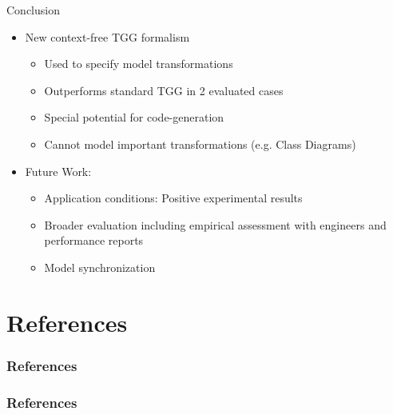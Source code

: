 \documentclass[usenames,dvipsnames]{beamer}
\begin{document}
	\begin{frame}{Conclusion}
		\begin{itemize}
			\item New context-free TGG formalism
			\begin{itemize}
				\item Used to specify model transformations
				\item Outperforms standard TGG in 2 evaluated cases
				\item Special potential for code-generation
				\item Cannot model important transformations (e.g. Class Diagrams)
			\end{itemize}
			\pause
			\item Future Work:
			\begin{itemize}
				\item Application conditions: Positive experimental results
				\item Broader evaluation including empirical assessment with engineers and performance reports
				\item Model synchronization
			\end{itemize}
		\end{itemize}
	\end{frame}
	
	\section{References}
	\begin{frame}
		\frametitle{References}
	\end{frame}
	
	\begin{frame}
		\frametitle{References}
		\tiny
		
		
	\end{frame}
\end{document}
